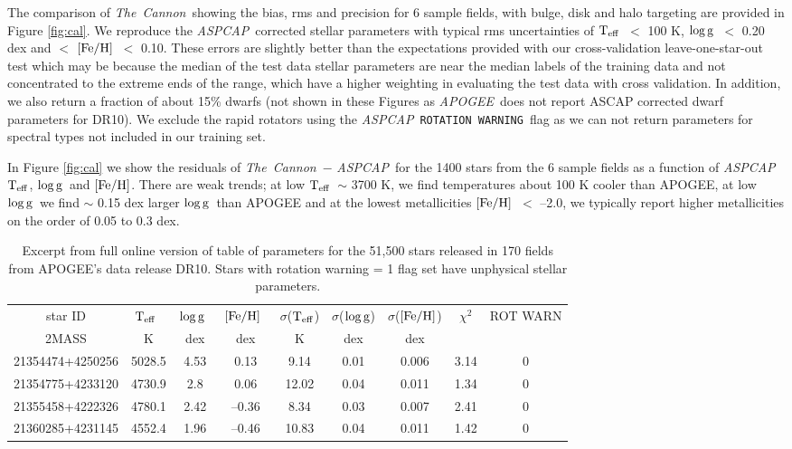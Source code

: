 \documentclass[12pt, preprint]{aastex}
\newcommand{\teff}{\mbox{$\rm T_{eff}$}}
\newcommand{\feh}{\mbox{$\rm [Fe/H]$}}
\newcommand{\logg}{\mbox{$\rm \log g$}}
\newcommand{\tc}{\textsl{The~Cannon}}
\newcommand{\apogee}{\textsl{APOGEE}}
\newcommand{\aspcap}{\textsl{ASPCAP}}
\newcommand{\rotwarn}{\texttt{ROTATION WARNING}}
\begin{document}
The comparison of \tc\, showing the bias, rms and precision for 6 sample fields, with bulge, disk and halo targeting are provided in Figure \ref{fig:cal}. We reproduce the \aspcap\ corrected stellar parameters with typical rms uncertainties of \teff\ $<$ 100 K, \logg\ $<$ 0.20 dex and $<$ \feh\ $<$ 0.10. These errors are slightly better than the expectations provided with our cross-validation leave-one-star-out test which may be because the median of the test data stellar parameters are near the median labels of the training data and not concentrated to the extreme ends of the range, which have a higher weighting in evaluating the test data with cross validation. In addition, we also return a fraction of about 15\% dwarfs (not shown in these Figures as \apogee\ does not report ASCAP corrected dwarf parameters for DR10). We exclude the rapid rotators using the \aspcap\ \rotwarn\ flag as we can not return parameters for spectral types not included in our training set. 

In Figure \ref{fig:cal} we show the residuals of \tc\ $-$ \aspcap\ for the 1400 stars from the 6 sample fields as a function of \aspcap\ \teff, \logg\ and \feh. There are weak trends; at low \teff\ $\sim$ 3700 K, we find temperatures about 100 K cooler than APOGEE, at low \logg\ we find $\sim$ 0.15 dex larger \logg\ than APOGEE and at the lowest metallicities \feh\ $<$ --2.0, we typically report higher metallicities on the order of 0.05 to 0.3 dex. 

\begin{table}[!h]
\small{
\centering
\caption{Excerpt from full online version of table of parameters for the 51,500 stars released in 170 fields from APOGEE's data release DR10. Stars with rotation warning = 1 flag set have unphysical stellar parameters.} \begin{tabular}{| c | c | c |  c | c | c |  c | c | c |}
\hline
star ID & \teff\ & \logg\ & \feh\ & $\sigma$(\teff) & $\sigma$(\logg) & $\sigma$(\feh) & $\chi^2$ & \tiny{ROT WARN}\\
{2MASS} &  K &  dex  & dex & K & dex & dex & & \\    
\hline
21354474+4250256 & 5028.5 & 4.53 & 0.13 & 9.14 & 0.01 & 0.006 & 3.14 & 0\\
21354775+4233120 & 4730.9 & 2.8 & 0.06 & 12.02 & 0.04 & 0.011 & 1.34 & 0\\
21355458+4222326 & 4780.1 & 2.42 & --0.36 & 8.34 & 0.03 & 0.007 & 2.41 & 0\\
21360285+4231145 &  4552.4 &  1.96 & --0.46  & 10.83 & 0.04 & 0.011 &  1.42 &  0\\
 \hline
\end{tabular}
\label{tab:online} }
\end{table}  
 
\end{document}
